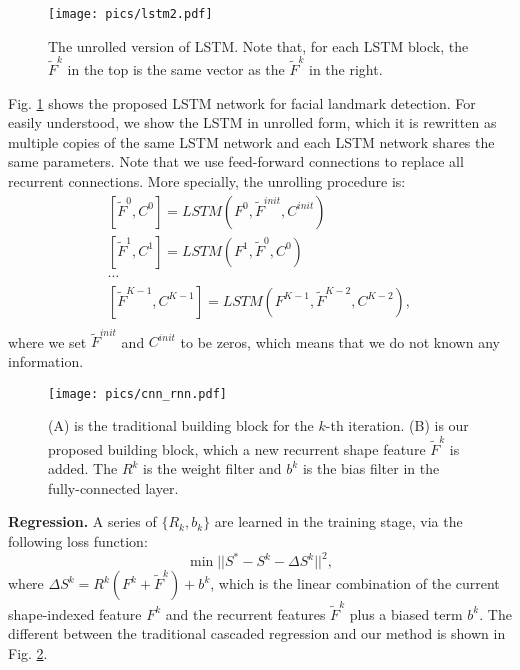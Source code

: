 \documentclass[journal]{IEEEtran}
\begin{document}
\begin{figure}[h]
\centering
    \texttt{[image: pics/lstm2.pdf]}
  \caption{The unrolled version of LSTM. Note that, for each LSTM block, the $\widetilde{F}^{k}$ in the top is the same vector as the $\widetilde{F}^{k}$ in the right.  }
  \label{lstm2}  %
\end{figure}

Fig. \ref{lstm2} shows the proposed LSTM network for facial landmark detection. For easily understood, we show the LSTM in unrolled form, which it is rewritten as multiple copies of the same LSTM network and each LSTM network shares the same parameters. Note that we use feed-forward connections to replace all recurrent connections. More specially, the unrolling procedure is:
\begin{equation}
\begin{aligned}
&[\widetilde{F}^0,C^0] = LSTM(F^0, \widetilde{F}^{init},C^{init})& \\
&[\widetilde{F}^1,C^1] = LSTM(F^1, \widetilde{F}^0,C^0)& \\
&\cdots& \\
&[\widetilde{F}^{K-1},C^{K-1}] = LSTM(F^{K-1}, \widetilde{F}^{K-2},C^{K-2}),& \\
\end{aligned}
\end{equation}
where we set $\widetilde{F}^{init}$ and $C^{init}$ to be zeros, which means that we do not known any information.

\begin{figure}[h]
\centering
    \texttt{[image: pics/cnn\_rnn.pdf]}
  \caption{(A) is the traditional building block for the $k$-th iteration. (B) is our proposed building block, which a new recurrent  shape feature  $\widetilde{F}^{k}$ is added. The $R^k$ is the weight filter and $b^k$ is the bias filter in the fully-connected layer.  }
  \label{cnn_rnn}  %
\end{figure}


\textbf{Regression.} \label{regression}
A series of $\{R_k, b_k\}$ are learned in the training stage, via the following loss function:
\begin{equation}
\min ||S^{*} - S^k - \Delta S^k||^2,
\label{least_squares_k}
\end{equation}
where $\Delta S^k = R^k (F^k + \widetilde{F}^{k}) + b^k$, which is the linear combination of the current shape-indexed feature $F^k$ and the recurrent features $\widetilde{F}^{k}$ plus a biased term $b^k$. The different between the traditional cascaded regression and our method is shown in Fig. \ref{cnn_rnn}.
\end{document}
